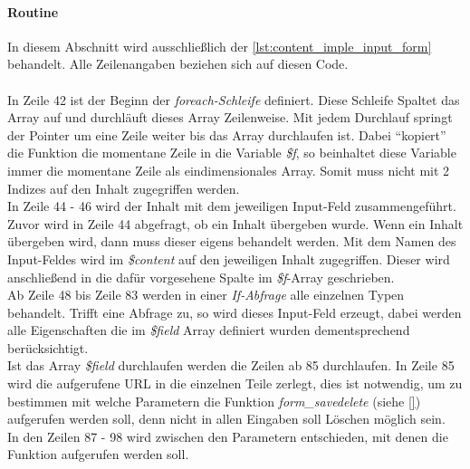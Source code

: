 \paragraph{Routine}
In diesem Abschnitt wird ausschließlich der \autoref{lst:content_imple_input_form} behandelt. Alle Zeilenangaben beziehen sich auf diesen Code.\\
\\
In Zeile 42 ist der Beginn der \textit{foreach-Schleife} definiert. Diese Schleife Spaltet das Array auf und durchläuft dieses Array Zeilenweise. Mit jedem Durchlauf springt der Pointer um eine Zeile weiter bis das Array durchlaufen ist. Dabei \enquote{kopiert} die Funktion die momentane Zeile in die Variable \textit{\$f}, so beinhaltet diese Variable immer die momentane Zeile als eindimensionales Array. Somit muss nicht mit 2 Indizes auf den Inhalt zugegriffen werden.\\
In Zeile 44 - 46 wird der Inhalt mit dem jeweiligen Input-Feld zusammengeführt. Zuvor wird in Zeile 44 abgefragt, ob ein Inhalt übergeben wurde. Wenn ein Inhalt übergeben wird, dann muss dieser eigens behandelt werden. Mit dem Namen des Input-Feldes wird im \textit{\$content} auf den jeweiligen Inhalt zugegriffen. Dieser wird anschließend in die dafür vorgesehene Spalte im \textit{\$f}-Array geschrieben.\\
Ab Zeile 48 bis Zeile 83 werden in einer \textit{If-Abfrage} alle einzelnen Typen behandelt. Trifft eine Abfrage zu, so wird dieses Input-Feld erzeugt, dabei werden alle Eigenschaften die im \textit{\$field} Array definiert wurden dementsprechend berücksichtigt.\\
Ist das Array \textit{\$field} durchlaufen werden die Zeilen ab 85 durchlaufen. In Zeile 85 wird die aufgerufene URL in die einzelnen Teile zerlegt, dies ist notwendig, um zu bestimmen mit welche Parametern die Funktion \textit{form\_savedelete} (siehe \autoref{}) aufgerufen werden soll, denn nicht in allen Eingaben soll Löschen möglich sein.\\
In den Zeilen 87 - 98 wird zwischen den Parametern entschieden, mit denen die Funktion aufgerufen werden soll.


